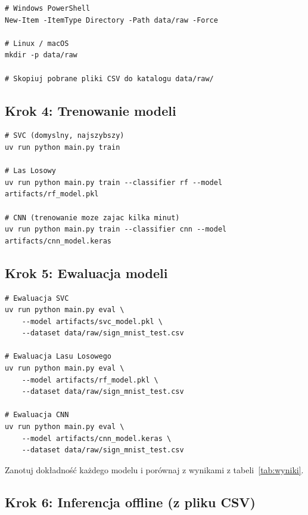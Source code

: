 \begin{lstlisting}[style=styleBash, numbers=none, caption={Przygotowanie struktury katalogów na dane}, label=lst:dirs]
# Windows PowerShell
New-Item -ItemType Directory -Path data/raw -Force

# Linux / macOS
mkdir -p data/raw

# Skopiuj pobrane pliki CSV do katalogu data/raw/
\end{lstlisting}

\subsection*{Krok 4: Trenowanie modeli}

\begin{lstlisting}[style=styleBash, numbers=none, caption={Trenowanie wszystkich trzech klasyfikatorów}, label=lst:train-all]
# SVC (domyslny, najszybszy)
uv run python main.py train

# Las Losowy
uv run python main.py train --classifier rf --model artifacts/rf_model.pkl

# CNN (trenowanie moze zajac kilka minut)
uv run python main.py train --classifier cnn --model artifacts/cnn_model.keras
\end{lstlisting}

\subsection*{Krok 5: Ewaluacja modeli}

\begin{lstlisting}[style=styleBash, numbers=none, caption={Ewaluacja wytrenowanych modeli}, label=lst:eval-all]
# Ewaluacja SVC
uv run python main.py eval \
    --model artifacts/svc_model.pkl \
    --dataset data/raw/sign_mnist_test.csv

# Ewaluacja Lasu Losowego
uv run python main.py eval \
    --model artifacts/rf_model.pkl \
    --dataset data/raw/sign_mnist_test.csv

# Ewaluacja CNN
uv run python main.py eval \
    --model artifacts/cnn_model.keras \
    --dataset data/raw/sign_mnist_test.csv
\end{lstlisting}

Zanotuj dokładność każdego modelu i porównaj z wynikami z tabeli~\ref{tab:wyniki}.

\subsection*{Krok 6: Inferencja offline (z pliku CSV)}

